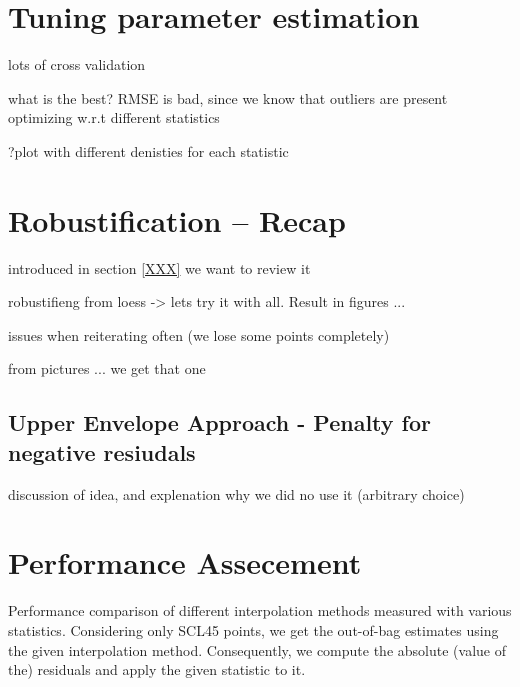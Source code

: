 


\section{Tuning parameter estimation}
lots of cross validation

what is the best? RMSE is bad, since we know that outliers are present
optimizing w.r.t different statistics

?plot with different denisties for each statistic


\section{Robustification -- Recap}
introduced in section \ref{XXX} we want to review it

robustifieng from loess -> lets try it with all. Result in figures ...

issues when reiterating often (we lose some points completely)

from pictures ... we get that one 

\subsection{Upper Envelope Approach - Penalty for negative resiudals}
discussion of idea, and explenation why we did no use it (arbitrary choice)


\section{Performance Assecement}
\begin{table}
	\begin{center}
		\caption{Performance comparison of different interpolation methods measured with various statistics. Considering only SCL45 points, we get the out-of-bag estimates using the given interpolation method. Consequently, we compute the absolute (value of the) residuals and apply the given statistic to it.}
		\small
		
		\normalsize
	\end{center}
\end{table}





